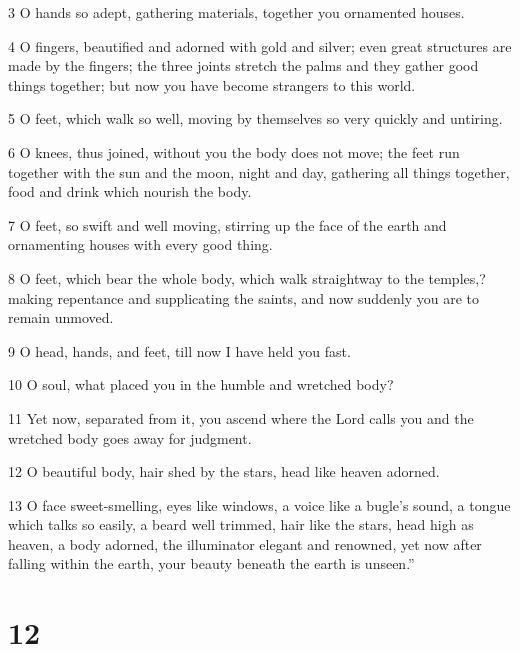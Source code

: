 \par 3 O hands so adept, gathering materials, together you ornamented houses. 

\par 4 O fingers, beautified and adorned with gold and silver; even great structures are made by the fingers; the three joints stretch the palms and they gather good things together; but now you have become strangers to this world. 

\par 5 O feet, which walk so well, moving by themselves so very quickly and untiring. 

\par 6 O knees, thus joined, without you the body does not move; the feet run together with the sun and the moon, night and day, gathering all things together, food and drink which nourish the body. 

\par 7 O feet, so swift and well moving, stirring up the face of the earth and ornamenting houses with every good thing. 

\par 8 O feet, which bear the whole body, which walk straightway to the temples,? making repentance and supplicating the saints, and now suddenly you are to remain unmoved. 

\par 9 O head, hands, and feet, till now I have held you fast. 

\par 10 O soul, what placed you in the humble and wretched body? 

\par 11 Yet now, separated from it, you ascend where the Lord calls you and the wretched body goes away for judgment. 

\par 12 O beautiful body, hair shed by the stars, head like heaven adorned. 

\par 13 O face sweet-smelling, eyes like windows, a voice like a bugle’s sound, a tongue which talks so easily, a beard well trimmed, hair like the stars, head high as heaven, a body adorned, the illuminator elegant and renowned, yet now after falling within the earth, your beauty beneath the earth is unseen.” 

\chapter{12}

